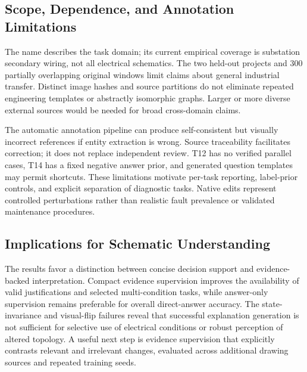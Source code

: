 \subsection{Scope, Dependence, and Annotation Limitations}
The name \dataset describes the task domain; its current empirical coverage is substation secondary wiring, not all electrical schematics. The two held-out projects and 300 partially overlapping original windows limit claims about general industrial transfer. Distinct image hashes and source partitions do not eliminate repeated engineering templates or abstractly isomorphic graphs. Larger or more diverse external sources would be needed for broad cross-domain claims.

The automatic annotation pipeline can produce self-consistent but visually incorrect references if entity extraction is wrong. Source traceability facilitates correction; it does not replace independent review. T12 has no verified parallel cases, T14 has a fixed negative answer prior, and generated question templates may permit shortcuts. These limitations motivate per-task reporting, label-prior controls, and explicit separation of diagnostic tasks. Native edits represent controlled perturbations rather than realistic fault prevalence or validated maintenance procedures.

\subsection{Implications for Schematic Understanding}
The results favor a distinction between concise decision support and evidence-backed interpretation. Compact evidence supervision improves the availability of valid justifications and selected multi-condition tasks, while answer-only supervision remains preferable for overall direct-answer accuracy. The state-invariance and visual-flip failures reveal that successful explanation generation is not sufficient for selective use of electrical conditions or robust perception of altered topology. A useful next step is evidence supervision that explicitly contrasts relevant and irrelevant changes, evaluated across additional drawing sources and repeated training seeds.
